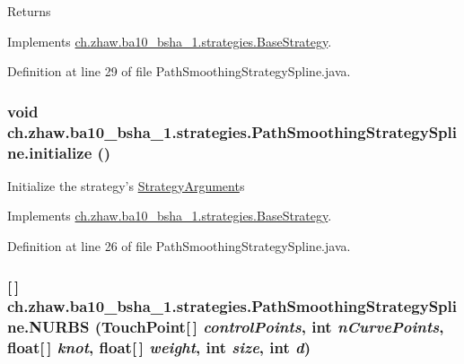 \begin{DoxyReturn}{Returns}

\end{DoxyReturn}


Implements \hyperlink{classch_1_1zhaw_1_1ba10__bsha__1_1_1strategies_1_1BaseStrategy_aa0ebed55eed45409bad13d43a0058780}{ch.zhaw.ba10\_\-bsha\_\-1.strategies.BaseStrategy}.

Definition at line 29 of file PathSmoothingStrategySpline.java.\hypertarget{classch_1_1zhaw_1_1ba10__bsha__1_1_1strategies_1_1PathSmoothingStrategySpline_a4f2972f63f03c195fa006367e8e745c6}{
\subsubsection[{initialize}]{\setlength{\rightskip}{0pt plus 5cm}void ch.zhaw.ba10\_\-bsha\_\-1.strategies.PathSmoothingStrategySpline.initialize ()}}
\label{classch_1_1zhaw_1_1ba10__bsha__1_1_1strategies_1_1PathSmoothingStrategySpline_a4f2972f63f03c195fa006367e8e745c6}
Initialize the strategy's \hyperlink{classch_1_1zhaw_1_1ba10__bsha__1_1_1StrategyArgument}{StrategyArgument}s 

Implements \hyperlink{classch_1_1zhaw_1_1ba10__bsha__1_1_1strategies_1_1BaseStrategy_af6ea27835befac71906915236a347450}{ch.zhaw.ba10\_\-bsha\_\-1.strategies.BaseStrategy}.

Definition at line 26 of file PathSmoothingStrategySpline.java.\hypertarget{classch_1_1zhaw_1_1ba10__bsha__1_1_1strategies_1_1PathSmoothingStrategySpline_af58eb333b4b6ee0e1808b1bd68cbca69}{
\subsubsection[{NURBS}]{ \mbox{[}$\,$\mbox{]} ch.zhaw.ba10\_\-bsha\_\-1.strategies.PathSmoothingStrategySpline.NURBS ({\bf TouchPoint}\mbox{[}$\,$\mbox{]} {\em controlPoints}, \/  int {\em nCurvePoints}, \/  float\mbox{[}$\,$\mbox{]} {\em knot}, \/  float\mbox{[}$\,$\mbox{]} {\em weight}, \/  int {\em size}, \/  int {\em d})}}
\label{classch_1_1zhaw_1_1ba10__bsha__1_1_1strategies_1_1PathSmoothingStrategySpline_af58eb333b4b6ee0e1808b1bd68cbca69}


